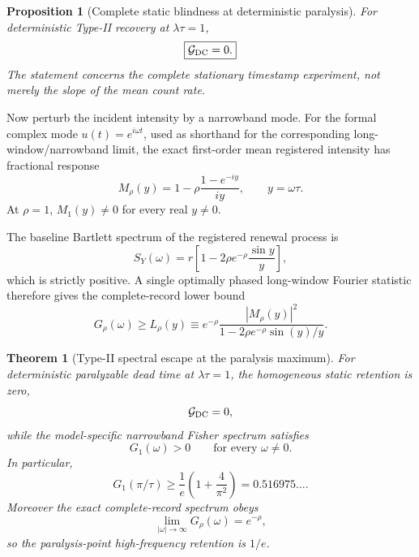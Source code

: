 \documentclass[aps,prapplied,preprint,nofootinbib]{revtex4-2}
\newtheorem{theorem}{Theorem}
\newtheorem{proposition}{Proposition}
\newcommand{\GDC}{\mathcal G_{\rm DC}}
\begin{document}
\begin{proposition}[Complete static blindness at deterministic paralysis]
\label{prop:staticZero}
For deterministic Type-II recovery at $\lambda\tau=1$,
\begin{equation}
\boxed{\GDC=0.}
\end{equation}
The statement concerns the complete stationary timestamp experiment, not merely the slope of the mean count rate.
\end{proposition}

Now perturb the incident intensity by a narrowband mode. For the formal complex mode $u(t)=e^{i\omega t}$, used as shorthand for the corresponding long-window/narrowband limit, the exact first-order mean registered intensity has fractional response
\begin{equation}
M_\rho(y)
=1-\rho\frac{1-e^{-iy}}{iy},
\qquad y=\omega\tau.
\label{eq:Mrho}
\end{equation}
At $\rho=1$, $M_1(y)\neq0$ for every real $y\neq0$.

The baseline Bartlett spectrum of the registered renewal process is
\begin{equation}
S_Y(\omega)
=r\left[1-2\rho e^{-\rho}\frac{\sin y}{y}\right],
\label{eq:Bartlett}
\end{equation}
which is strictly positive. A single optimally phased long-window Fourier statistic therefore gives the complete-record lower bound
\begin{equation}
G_\rho(\omega)
\ge
L_\rho(y)
\equiv
e^{-\rho}
\frac{|M_\rho(y)|^2}
{1-2\rho e^{-\rho}\sin(y)/y}.
\label{eq:lowerBound}
\end{equation}

\begin{theorem}[Type-II spectral escape at the paralysis maximum]
\label{thm:spectralEscape}
For deterministic paralyzable dead time at $\lambda\tau=1$, the homogeneous static retention is zero,
\begin{equation}
\GDC=0,
\end{equation}
while the model-specific narrowband Fisher spectrum satisfies
\begin{equation}
\boxed{
G_1(\omega)>0\qquad\text{for every }\omega\neq0.
}
\label{eq:positiveAllNonzero}
\end{equation}
In particular,
\begin{equation}
\boxed{
G_1(\pi/\tau)
\ge\frac1e\left(1+\frac4{\pi^2}\right)
=0.516975\ldots .
}
\label{eq:piBound}
\end{equation}
Moreover the exact complete-record spectrum obeys
\begin{equation}
\boxed{
\lim_{|\omega|\to\infty}G_\rho(\omega)=e^{-\rho},
}
\label{eq:highfreq}
\end{equation}
so the paralysis-point high-frequency retention is $1/e$.
\end{theorem}
\end{document}
